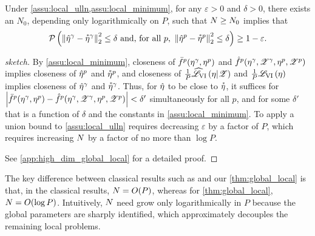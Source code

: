 %
\begin{theorem}\label{thm:global_local}
%
Under \cref{assu:local_ulln,assu:local_minimum}, for any $\varepsilon > 0$ and
$\delta > 0$, there exists an $N_0$, depending only logarithmically on $P$,
such that $N \ge N_0$ implies that
%
\begin{align*}
%
\p\left(
\norm{\etahat^\gamma - \etastar^\gamma}_2^2 \le \delta
\textrm{ and, for all }p\textrm{, }
        \norm{\etahat^p - \etastar^p}_2^2 \le \delta
\right)
\ge 1- \varepsilon.
%
\end{align*}
%
\begin{proof}[sketch]
%
By \cref{assu:local_minimum}, closeness of $\bar{f}^p(\eta^\gamma, \eta^p)$ and
$\hat{f}^p(\eta^\gamma, \mathscr{Z}^\gamma, \eta^p, \mathscr{Z}^p)$ implies closeness of $\hat{\eta}^p$
and $\accentset{*}{\eta}^p$, and closeness of $\frac{1}{P} \widehat{\mathscr{L}}_{\mathrm{VI}}\left(\eta | \mathscr{Z}\right)$ and
$\frac{1}{P} \mathscr{L}_{\mathrm{VI}}\left(\eta\right)$ implies closeness of $\hat{\eta}^\gamma$ and
$\accentset{*}{\eta}^\gamma$.  Thus, for $\hat{\eta}$ to be close to $\accentset{*}{\eta}$, it suffices
for $\left| \bar{f}^p(\eta^\gamma, \eta^p) - \hat{f}^p(\eta^\gamma, \mathscr{Z}^\gamma, \eta^p,
\mathscr{Z}^p)\right| < \delta'$ simultaneously for all $p$, and for some $\delta'$ that is a function of
$\delta$ and the constants in \cref{assu:local_minimum}. To apply a union bound
to \cref{assu:local_ulln} requires decreasing $\varepsilon$ by a factor of $P$,
which requires increasing $N$ by a factor of no more than $\log P$.

See \cref{app:high_dim_global_local} for a detailed proof.
%
\end{proof}
%
\end{theorem}

The key difference between classical results such as \citet[Chapter
5]{shapiro:2021:lectures} and our \cref{thm:global_local} is that, in the
classical results, $N = O(P)$, whereas for \cref{thm:global_local}, $N =
O(\log P)$.  Intuitively, $N$ need grow only logarithmically in $P$ because
the global parameters are sharply identified, which approximately decouples the
remaining local problems.